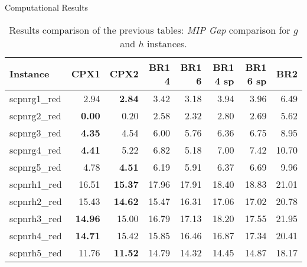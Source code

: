 \documentclass[a4paper,12pt]{mydeitesi_eng}
\begin{document}
\begin{chapter}{Computational Results}
\begin{table}[h]
\begin{center}
\begin{tabular}{l|r|r|r|r|r|r|r}
\textbf{Instance} & \textbf{CPX1} & \textbf{CPX2} & \textbf{BR1 4} &\textbf{BR1 6} & \textbf{BR1 4 sp} & \textbf{BR1 6 sp} & \textbf{BR2} \\
\hline
scpnrg1\_red & 2.94 & \textbf{2.84} & 3.42 & 3.18 & 3.94 & 3.96 & 6.49\\
scpnrg2\_red & \textbf{0.00} & 0.20 & 2.58 & 2.32 & 2.80 & 2.69 & 5.62\\
scpnrg3\_red & \textbf{4.35} & 4.54 & 6.00 & 5.76 & 6.36 & 6.75 & 8.95\\
scpnrg4\_red & \textbf{4.41} & 5.22 & 6.82 & 5.18 & 7.00 & 7.42 & 10.70\\
scpnrg5\_red & 4.78 & \textbf{4.51} & 6.19 & 5.91 & 6.37 & 6.69 & 9.96\\
\hline
scpnrh1\_red & 16.51 & \textbf{15.37} & 17.96 & 17.91 & 18.40 & 18.83 & 21.01\\
scpnrh2\_red & 15.43 & \textbf{14.62} & 15.47 & 16.31 & 17.06 & 17.02 & 20.78\\
scpnrh3\_red & \textbf{14.96} & 15.00 & 16.79 & 17.13 & 18.20 & 17.55 & 21.95\\
scpnrh4\_red & \textbf{14.71} & 15.42 & 15.85 & 16.46 & 16.87 & 17.34 & 20.41\\
scpnrh5\_red & 11.76 & \textbf{11.52} & 14.79 & 14.32 & 14.45 & 14.87 & 18.17\\
\end{tabular}
\end{center}
\caption{Results comparison of the previous tables: \emph{MIP Gap} comparison for $g$ and $h$ instances.}
\label{tab:ResultGapComp}
\end{table}


\end{chapter}
\newpage
\end{document}
